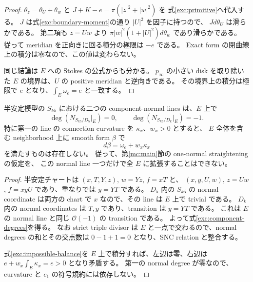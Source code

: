 \begin{proof}
$\theta_z=\theta_U+\theta_w$ と $J+K-e=\pi(|z|^2+|w|^2)$ を
式\eqref{exc:primitive}へ代入する。
$J$ は式\eqref{exc:boundary-moment}の通り $|U|^2$ を因子に持つので、
$Jd\theta_U$ は滑らかである。
第二項も $z=Uw$ より $\pi|w|^2(1+|U|^2)d\theta_w$ であり滑らかである。
従って meridian を正向きに回る積分の極限は $-e$ である。
Exact form の閉曲線上の積分は零なので、この値は変わらない。

同じ結論は $E$ への Stokes の公式からも分かる。
$p_\infty$ の小さい disk を取り除いた $E$ の境界は、$U$ の positive meridian と逆向きである。
その境界上の積分は極限で $e$ となり、$\int_E\omega_e=e$ と一致する。
\end{proof}

\begin{proposition}
\label{exc:whole-e}
半安定模型の $S_{k5}$ における二つの component-normal lines は、$E$ 上で
\begin{equation}\label{exc:component-degrees}
 \deg(N_{S_{k5}/D_5}|_E)=0,\qquad
 \deg(N_{S_{k5}/D_k}|_E)=-1.
\end{equation}
特に第一の line の connection curvature を $\kappa_x$、$w_x>0$ とすると、
$E$ 全体を含む neighborhood 上に smooth form $\beta$ で
\begin{equation}\label{exc:impossible-balance}
 d\beta=\omega_e+w_x\kappa_x
\end{equation}
を満たすものは存在しない。
従って、第\ref{mc:main}節の one-normal straightening の仮定を、
この normal line 一つだけで全 $E$ に拡張することはできない。
\end{proposition}

\begin{proof}
半安定チャートは $(x,T,Y,z)$, $w=Yz$, $f=xT$ と、
$(x,y,U,w)$, $z=Uw$, $f=xyU$ であり、重なりでは $y=YT$ である。
$D_5$ 内の $S_{k5}$ の normal coordinate は両方の chart で $x$ なので、その line は $E$ 上で trivial である。
$D_k$ 内の normal coordinates は $T,y$ であり、transition は $y=YT$ である。
これは $E$ の normal line と同じ $\mathcal O(-1)$ の transition である。
よって式\eqref{exc:component-degrees}を得る。
なお strict triple divisor は $E$ と一点で交わるので、normal degrees の和とその交点数は
$0-1+1=0$ となり、SNC relation と整合する。

式\eqref{exc:impossible-balance}を $E$ 上で積分すれば、左辺は零、右辺は
$e+w_x\int_E\kappa_x=e>0$ となり矛盾する。
第一の normal degree が零なので、curvature と $c_1$ の符号規約には依存しない。
\end{proof}

